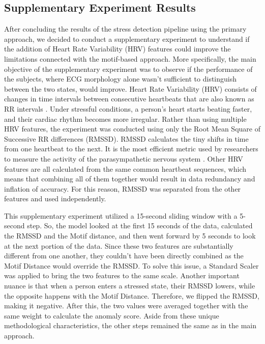 \documentclass[conference,10pt]{IEEEtran}
\begin{document}
\subsection{Supplementary Experiment Results}

After concluding the results of the stress detection pipeline using the primary approach, we decided to conduct a supplementary experiment to understand if the addition of Heart Rate Variability (HRV) features could improve the limitations connected with the motif-based approach. More specifically, the main objective of the supplementary experiment was to observe if the performance of the subjects, where ECG morphology alone wasn’t sufficient to distinguish between the two states, would improve. 
Heart Rate Variability (HRV) consists of changes in time intervals between consecutive heartbeats that are also known as RR intervals \cite{r25}. Under stressful conditions, a person’s heart starts beating faster, and their cardiac rhythm becomes more irregular.
Rather than using multiple HRV features, the experiment was conducted using only the Root Mean Square of Successive RR differences (RMSSD). RMSSD calculates the tiny shifts in time from one heartbeat to the next. It is the most efficient metric used by researchers to measure the activity of the parasympathetic nervous system \cite{r25}. Other HRV features are all calculated from the same common heartbeat sequences, which means that combining all of them together would result in data redundancy and inflation of accuracy. For this reason, RMSSD was separated from the other features and used independently.

This supplementary experiment utilized a 15-second sliding window with a 5-second step. So, the model looked at the first 15 seconds of the data, calculated the RMSSD and the Motif distance, and then went forward by 5 seconds to look at the next portion of the data. 
Since these two features are substantially different from one another, they couldn't have been directly combined as the Motif Distance would override the RMSSD. To solve this issue, a Standard Scaler was applied to bring the two features to the same scale. Another important nuance is that when a person enters a stressed state, their RMSSD lowers, while the opposite happens with the Motif Distance. Therefore, we flipped the RMSSD, making it negative. After this, the two values were averaged together with the same weight to calculate the anomaly score. Aside from these unique methodological characteristics, the other steps remained the same as in the main approach. 
\end{document}
